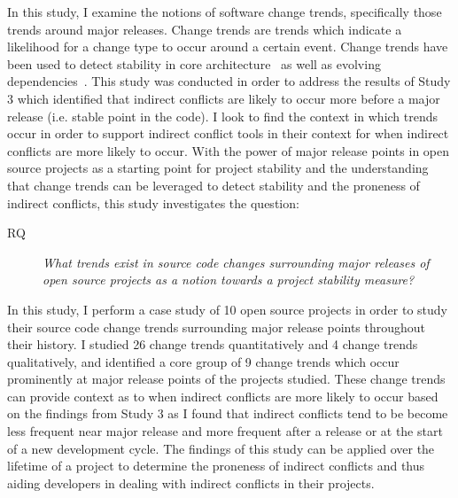 In this study, I examine the notions of software change trends, specifically those trends around major releases. Change trends are trends which indicate
a likelihood for a change type to occur around a certain event. Change trends have been used to detect
stability in core architecture~\cite{Wermelinger:2008:AEE} as well as evolving dependencies~\cite{Businge:2010:ESE}.
This study was conducted in order to address the results of Study 3 which identified that indirect conflicts are likely to occur more
before a major release (i.e. stable point in the code). I look to find the context in which trends occur in order to support
indirect conflict tools in their context for when indirect conflicts are more likely to occur.
With the power of major release points in open source projects as a starting point for project stability and the understanding that change trends can
be leveraged to detect stability and the proneness of indirect conflicts, this study investigates the question:

\begin{description}
        \item[RQ] \textit{What trends exist in source code changes surrounding major releases of open 
        source projects as a notion towards a project stability measure?}
\end{description}

In this study, I perform a case study of 10 open source projects in order to study their source code change trends surrounding major release points
throughout their history. I studied 26 change trends quantitatively and 4 change trends qualitatively, and identified a core group of 9 change trends which occur
prominently at major release points of the projects studied. These change trends can provide context as to when indirect conflicts are more likely
to occur based on the findings from Study 3 as I found that indirect conflicts tend to be become less frequent near major release and more
frequent after a release or at the start of a new development cycle. The findings of this study can be applied over the lifetime of a project
to determine the proneness of indirect conflicts and thus aiding developers in dealing with indirect conflicts in their projects.

